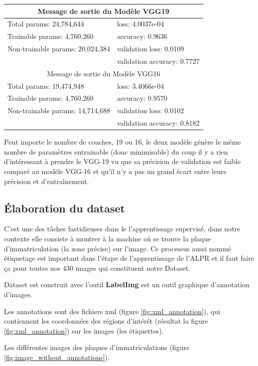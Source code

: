 	\begin{table}[H]
		\centering
		\begin{tabular}{p{6cm}|p{6cm}}\hline
			\multicolumn{2}{c}{Message de sortie du Modèle VGG19}\\
			\hline
			Total params: 24,784,644 & loss: 4.0037e-04 \\
			Trainable params: 4,760,260 & accuracy: 0.9636 \\
			Non-trainable params: 20,024,384 & validation loss: 0.0109 \\
			& validation accuracy: 0.7727 \\
			\hline
			\multicolumn{2}{c}{Message de sortie du Modèle VGG16}\\
			\hline
			
			Total params: 19,474,948 & loss: 3.4066e-04 \\
			Trainable params: 4,760,260 & accuracy: 0.9570 \\
			Non-trainable params: 14,714,688 & validation loss: 0.0102 \\
			& validation accuracy: 0.8182 \\
			\hline
		\end{tabular}
	\end{table}

	Peut importe le nombre de couches, 19 ou 16, le deux modèle génère le même nombre de paramètres entrainable (donc minimisable) du coup il y a rien d'intéressant à prendre le VGG-19 vu que sa précision de validation est faible comparé au modèle VGG-16 et qu’il n’y a pas un grand écart entre leurs précision et d'entraînement.
	
	\subsection{Élaboration du dataset}
	C'est une des tâches fastidieuses dans le l'apprentissage supervisé, dans notre contexte elle consiste à montrer à la machine où se trouve la plaque d'immatriculation (la zone précise) sur l'image. Ce processus aussi nommé étiquetage est important dans l'étape de l'apprentissage de l’ALPR et il faut faire ça pour toutes nos 430 images qui constituent notre Dataset.
	
	Dataset est construit avec l’outil \textbf{LabelImg} est un outil graphique d'annotation d'images.
	
	\begin{list}{--}{Ici, le dataset est un répertoire composé des deux sous répertoires qui contiennent :}
		\item Les annotations sont des fichiers xml (figure \ref{fig:xml_annotation}), qui contiennent les coordonnées des régions d'intérêt (résultat la figure \ref{fig:xml_annotation}) sur les images (les étiquettes).
		\item Les différentes images des plaques d'immatriculations (figure \ref{fig:image_without_annotations}). 
	\end{list}
	
